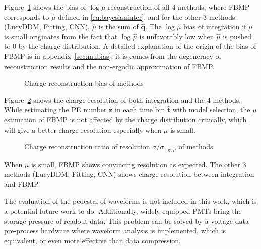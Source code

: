 Figure~\ref{fig:biasmu} shows the bias of $\log\mu$ reconstruction of all 4 methods, where $\mathrm{FBMP}$ corresponds to $\hat{\mu}$ defined in \eqref{eq:bayesianinter}, and for the other 3 methods (LucyDDM, Fitting, CNN), $\hat{\mu}$ is the sum of $\hat{\bm{q}}$. The $\log\hat{\mu}$ bias of integration if $\mu$ is small originates from the fact that $\log\hat{\mu}$ is unfavorably low when $\hat{\mu}$ is pushed to 0 by the charge distribution. A detailed explanation of the origin of the bias of FBMP is in appendix~\ref{sec:mubias}, it is comes from the degeneracy of reconstruction results and the non-ergodic approximation of FBMP. 

\begin{figure}[H]
    \centering
    \resizebox{\textwidth}{!}{}
    \caption{\label{fig:biasmu} Charge reconstruction bias of methods}
\end{figure}

Figure~\ref{fig:deltamu} shows the charge resolution of both integration and the 4 methods. While estimating the PE number $\hat{\bm{z}}$ in each time bin $\hat{\bm{t}}$ with model selection, the $\mu$ estimation of FBMP is not affected by the charge distribution critically, which will give a better charge resolution especially when $\mu$ is small. 

\begin{figure}[H]
    \centering
    \resizebox{\textwidth}{!}{}
    \caption{\label{fig:deltamu} Charge reconstruction ratio of resolution $\sigma/\sigma_{\log\mu}$ of methods}
\end{figure}

When $\mu$ is small, FBMP shows convincing resolution as expected. The other 3 methods (LucyDDM, Fitting, CNN) shows charge resolution between integration and FBMP. 


The evaluation of the pedestal of waveforms is not included in this work, which is a potential future work to do. Additionally, widely equipped PMTs bring the storage pressure of readout data. This problem can be solved by a voltage data pre-process hardware where waveform analysis is implemented, which is equivalent, or even more effective than data compression. 
